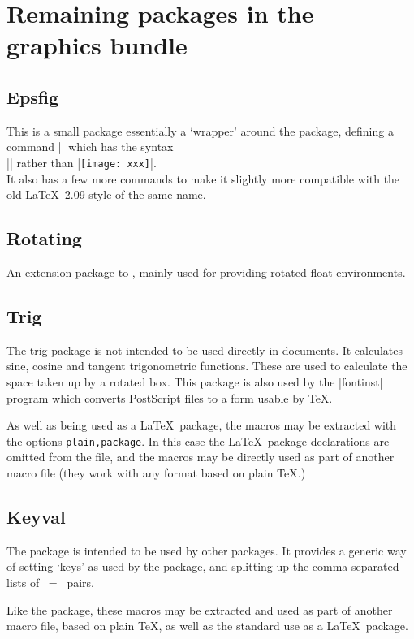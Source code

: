 \section{Remaining packages in the graphics bundle}

\subsection{Epsfig}
This is a small package essentially a `wrapper' around the
 package, defining a command |\psfig| which has the
syntax\\
|| rather than |\texttt{[image: xxx]}|.\\
It also has a few more commands to make it slightly more compatible with
the old \LaTeX~2.09 style of the same name.

\subsection{Rotating}
An extension package to , mainly used for providing
rotated float environments.

\subsection{Trig}
The trig package is not intended to be used directly in documents. It
calculates sine, cosine and tangent trigonometric functions. These
are used to calculate the space taken up by a rotated box. This
package is also used by the |fontinst| program which converts
PostScript files to a form usable by \TeX.

As well as being used as a \LaTeX\ package, the macros may be extracted
with the  options \texttt{plain,package}. In this case
the \LaTeX\ package declarations are omitted from the file, and the
macros may be directly used as part of another macro file (they work
with any format based on plain \TeX.)

\subsection{Keyval}
The  package is intended to be used by other
packages. It provides a generic way of setting `keys' as used by the
 package, and splitting up the comma separated lists
of ~=~ pairs.

Like the  package, these macros may be extracted and used
as part of another macro file, based on plain \TeX, as well as the
standard use as a \LaTeX\ package.

